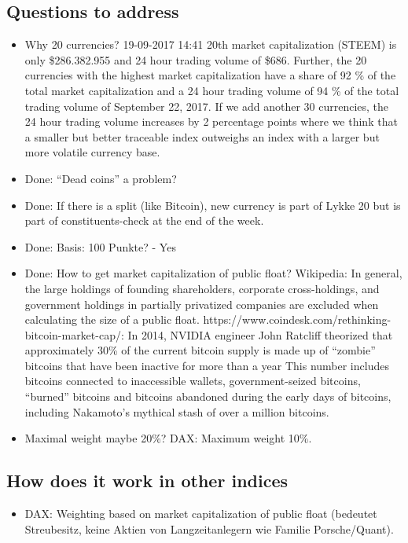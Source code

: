 \documentclass[11pt]{article}
\begin{document}
\subsection{Questions to address}
\begin{itemize}
  \item Why 20 currencies? 19-09-2017 14:41 20th market capitalization (STEEM) is only \$286.382.955 and 24 hour trading volume of \$686. Further, the 20 currencies with the highest market capitalization have a share of 92 \% of the total market capitalization and a 24 hour trading volume of 94 \% of the total trading volume of September 22, 2017. If we add another 30 currencies, the 24 hour trading volume increases by 2 percentage points where we think that a smaller but better traceable index outweighs an index with a larger but more volatile currency base.
  \item Done: ``Dead coins'' a problem?
  \item Done: If there is a split (like Bitcoin), new currency is part of Lykke 20 but is part of constituents-check at the end of the week.
  \item Done: Basis: 100 Punkte? - Yes
  \item Done: How to get market capitalization of public float? Wikipedia:  In general, the large holdings of founding shareholders, corporate cross-holdings, and government holdings in partially privatized companies are excluded when calculating the size of a public float. https://www.coindesk.com/rethinking-bitcoin-market-cap/: In 2014, NVIDIA engineer John Ratcliff theorized that approximately 30\% of the current bitcoin supply is made up of ``zombie'' bitcoins that have been inactive for more than a year This number includes bitcoins connected to inaccessible wallets, government-seized bitcoins, ``burned'' bitcoins and bitcoins abandoned during the early days of bitcoins, including Nakamoto's mythical stash of over a million bitcoins.
  \item Maximal weight maybe 20\%? DAX: Maximum weight 10\%.
\end{itemize}



\subsection{How does it work in other indices}

\begin{itemize}
  \item DAX: Weighting based on market capitalization of public float (bedeutet Streubesitz, keine Aktien von Langzeitanlegern  wie Familie Porsche/Quant).
\end{itemize}
\end{document}
